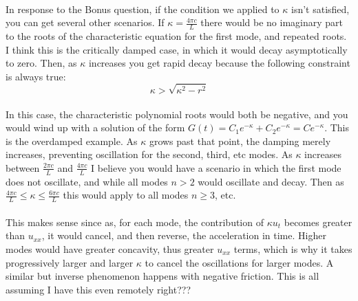 \documentclass{article}
\begin{document}
\\
In response to the Bonus question, if the condition we applied to $\kappa$ isn't satisfied, you can get several other scenarios. If $\kappa = \frac{4\pi c}{L}$ there would be no imaginary part to the roots of the characteristic equation for the first mode, and repeated roots. I think this is the critically damped case, in which it would decay asymptotically to zero. Then, as $\kappa$ increases you get rapid decay because the following constraint is always true:
\begin{equation}
\kappa > \sqrt{\kappa^2 - r^2}
\end{equation}
\\
In this case, the characteristic polynomial roots would both be negative, and you would wind up with a solution of the form $G(t) = C_1e^{-\kappa} + C_2e^{-\kappa} = Ce^{-\kappa}$. This is the overdamped example. As $\kappa$ grows past that point, the damping merely increases, preventing oscillation for the second, third, etc modes. As $\kappa$ increases between $\frac{2\pi c}{L}$ and  $\frac{4\pi c}{L}$ I believe you would have a scenario in which the first mode does not oscillate, and while all modes $n > 2$ would oscillate and decay. Then as $\frac{4\pi c}{L} \leq \kappa \leq \frac{6\pi c}{L}$ this would apply to all modes $n \geq 3$, etc. \\
\\
This makes sense since as, for each mode, the contribution of $\kappa u_t$ becomes greater than $u_{xx}$, it would cancel, and then reverse, the acceleration in time. Higher modes would have greater concavity, thus greater $u_{xx}$ terms, which is why it takes progressively larger and larger $\kappa$ to cancel the oscillations for larger modes. A similar but inverse phenomenon happens with negative friction. This is all assuming I have this even remotely right???
\end{document}
